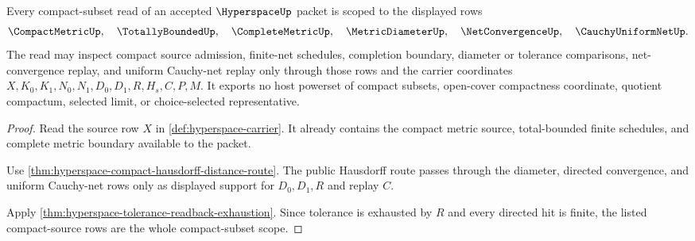 \begin{theorem}
\label{thm:hyperspace-compact-source-scope}
Every compact-subset read of an accepted $\HyperspaceUp$ packet is scoped to the displayed rows
$$
\CompactMetricUp,\quad \TotallyBoundedUp,\quad \CompleteMetricUp,\quad
\MetricDiameterUp,\quad \NetConvergenceUp,\quad \CauchyUniformNetUp .
$$
The read may inspect compact source admission, finite-net schedules, completion boundary, diameter or tolerance comparisons, net-convergence replay, and uniform Cauchy-net replay only through those rows and the carrier coordinates $X,K_0,K_1,N_0,N_1,D_0,D_1,R,H_s,C,P,M$. It exports no host powerset of compact subsets, open-cover compactness coordinate, quotient compactum, selected limit, or choice-selected representative.
\end{theorem}
\begin{proof}
Read the source row $X$ in \autoref{def:hyperspace-carrier}. It already contains the compact metric source, total-bounded finite schedules, and complete metric boundary available to the packet.

Use \autoref{thm:hyperspace-compact-hausdorff-distance-route}. The public Hausdorff route passes through the diameter, directed convergence, and uniform Cauchy-net rows only as displayed support for $D_0,D_1,R$ and replay $C$.

Apply \autoref{thm:hyperspace-tolerance-readback-exhaustion}. Since tolerance is exhausted by $R$ and every directed hit is finite, the listed compact-source rows are the whole compact-subset scope.
\end{proof}

